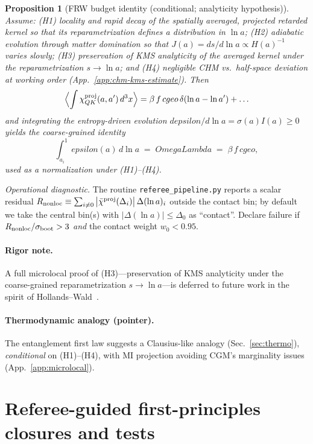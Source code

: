 \documentclass[aps,prd,onecolumn,superscriptaddress,nofootinbib]{revtex4-2}
\def\OmL{OmegaLambda}%
\def\cgeo{cgeo}%
\def\eps{epsilon}%
\def\Omega_\Lambda{OmegaLambda}%
\providecommand{\OmL}{\Omega_\Lambda}
\providecommand{\cgeo}{c_{\rm geo}}
\providecommand{\eps}{\varepsilon}
\providecommand{\be}{\begin{equation}}
\providecommand{\ee}{\end{equation}}
\newtheorem{proposition}{Proposition}
\begin{document}
\begin{proposition}[FRW budget identity (conditional; analyticity hypothesis)]
\label{prop:frw-budget}
Assume: (H1) locality and rapid decay of the spatially averaged, projected retarded kernel so that its reparametrization defines a distribution in \(\ln a\); (H2) adiabatic evolution through matter domination so that \(J(a)=ds/d\ln a\propto H(a)^{-1}\) varies slowly; (H3) preservation of KMS analyticity of the averaged kernel under the reparametrization \(s\!\to\!\ln a\); and (H4) negligible CHM vs.\ half-space deviation at working order (App.~\ref{app:chm-kms-estimate}). Then
\[
\Big\langle \!\int \chi^{\rm proj}_{QK}(a,a')\,d^3x \Big\rangle
= \beta\, f\, \cgeo\, \delta(\ln a-\ln a') + \ldots
\]
and integrating the entropy-driven evolution \(d\eps/d\ln a=\sigma(a)I(a)\ge0\) yields the coarse-grained identity
\be
\int_{a_i}^{1}\!\eps(a)\,d\ln a \;=\; \OmL \;=\; \beta\, f\,\cgeo,
\label{eq:budget}
\ee
used as a normalization under (H1)–(H4).
\end{proposition}
\noindent\emph{Operational diagnostic.} The routine \texttt{referee\_pipeline.py} reports a scalar residual \(R_{\rm nonloc}\equiv\sum_{i\neq 0}\big|\bar\chi^{\rm proj}(\Delta_i)\big|\,\Delta(\ln a)_i\) outside the contact bin; by default we take the central bin(s) with \(|\Delta(\ln a)|\le \Delta_0\) as ``contact''. Declare failure if \(R_{\rm nonloc}/\sigma_{\rm boot}>3\) \emph{and} the contact weight \(w_0<0.95\).

\paragraph{Rigor note.}
A full microlocal proof of (H3)—preservation of KMS analyticity under the coarse-grained reparametrization \(s\!\to\!\ln a\)—is deferred to future work in the spirit of Hollands–Wald~\cite{HollandsWald2001}.

\paragraph{Thermodynamic analogy (pointer).}
The entanglement first law suggests a Clausius-like analogy (Sec.~\ref{sec:thermo}), \emph{conditional} on (H1)–(H4), with MI projection avoiding CGM’s marginality issues (App.~\ref{app:microlocal}).

\section{Referee-guided first-principles closures and tests}
\label{sec:referee-additions}
\end{document}
